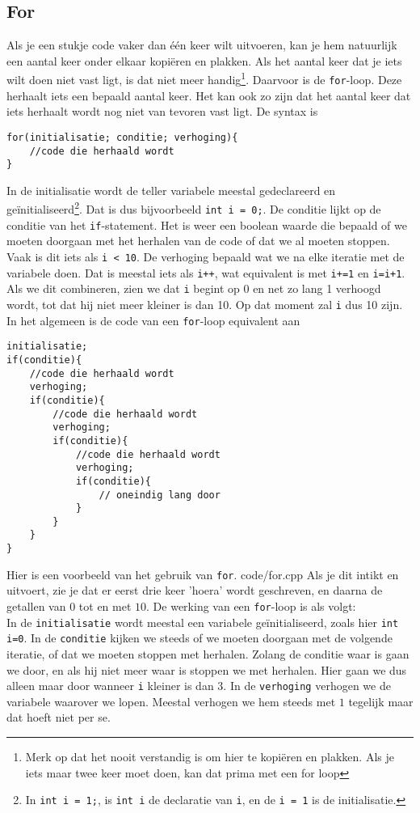 \documentclass[12pt,a4paper]{article}
\newcommand{\code}{}
\newcommand{\icode}{\lstinline}
\begin{document}
\subsection{For}
Als je een stukje code vaker dan \'e\'en keer wilt uitvoeren, kan je hem natuurlijk een aantal keer onder elkaar kopi\"eren en plakken. Als het aantal keer dat je iets wilt doen niet vast ligt, is dat niet meer handig\footnote{Merk op dat het nooit verstandig is om hier te kopi\"eren en plakken. Als je iets maar twee keer moet doen, kan dat prima met een for loop}. Daarvoor is de \icode{for}-loop.
Deze herhaalt iets een bepaald aantal keer. Het kan ook zo zijn dat het aantal keer dat iets herhaalt wordt nog niet van tevoren vast ligt. De syntax is
\begin{lstlisting}
for(initialisatie; conditie; verhoging){
	//code die herhaald wordt
}
\end{lstlisting}
In de initialisatie wordt de teller variabele meestal gedeclareerd en ge\"initialiseerd\footnote{In \icode{int i = 1;}, is \icode{int i} de declaratie van \icode{i}, en de \icode{i = 1} is de initialisatie.}. Dat is dus bijvoorbeeld \icode{int i = 0;}. De conditie lijkt op de conditie van het \icode{if}-statement. Het is weer een boolean waarde die bepaald of we moeten doorgaan met het herhalen van de code of dat we al moeten stoppen. Vaak is dit iets als \icode{i < 10}. De verhoging bepaald wat we na elke iteratie met de variabele doen. Dat is meestal iets als \icode{i++}, wat equivalent is met \icode{i+=1} en \icode{i=i+1}. Als we dit combineren, zien we dat \icode{i} begint op 0 en net zo lang 1 verhoogd wordt, tot dat hij niet meer kleiner is dan 10. Op dat moment zal \icode{i} dus 10 zijn. In het algemeen is de code van een \icode{for}-loop equivalent aan
\begin{lstlisting}
initialisatie;
if(conditie){
	//code die herhaald wordt
	verhoging;
	if(conditie){
		//code die herhaald wordt
		verhoging;
		if(conditie){
			//code die herhaald wordt
			verhoging;
			if(conditie){
				// oneindig lang door
			}
		}
	}
}
\end{lstlisting}
Hier is een voorbeeld van het gebruik van \icode{for}.
\code{code/for.cpp}
Als je dit intikt en uitvoert, zie je dat er eerst drie keer 'hoera' wordt geschreven, en daarna de getallen van $0$ tot en met $10$. De werking van een \icode{for}-loop is als volgt:\\
In de \icode{initialisatie} wordt meestal een variabele ge\"initialiseerd, zoals hier \icode{int i=0}. In de \icode{conditie} kijken we steeds of we moeten doorgaan met de volgende iteratie, of dat we moeten stoppen met herhalen. Zolang de conditie waar is gaan we door, en als hij niet meer waar is stoppen we met herhalen. Hier gaan we dus alleen maar door wanneer \icode{i} kleiner is dan $3$. In de \icode{verhoging} verhogen we de variabele waarover we lopen. Meestal verhogen we hem steeds met $1$ tegelijk maar dat hoeft niet per se.
\end{document}
